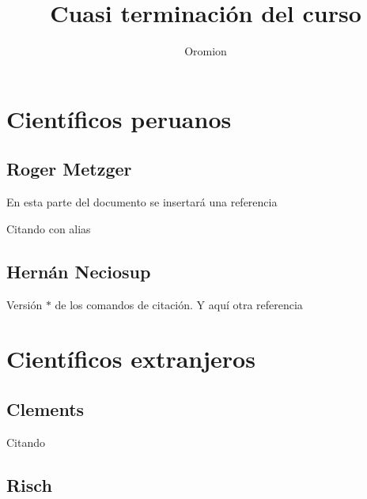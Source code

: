 \documentclass{oromion}
\title{Cuasi terminación del curso}
\subtitle[Terminando las tareas para obtener veinte de nota]
\author{Oromion}
\begin{document}
\maketitle

\section{Científicos peruanos}

\subsection{Roger Metzger}

En esta parte del documento se insertará una referencia \citep*[ver][pág. 250]{Metzger2000} 
\lipsum[1-4]

Citando con alias 

\subsection{Hernán Neciosup}

Versión $\ast$ de los comandos de citación. Y aquí otra referencia 
\citet{Beltran2017}

\lipsum[1-8]
\section{Científicos extranjeros}

\subsection{Clements}
Citando \citep{RAAB20121290,Raab2013}

\lipsum[1-5]

\citetext{Ver \textbf{foliaciones} en \citealp{Beltran2017} o también álgebra diferencial en \citealp{Risch1969a}}

\subsection{Risch}
\cite{Risch1969a}

\lipsum[1-10]


\end{document}
